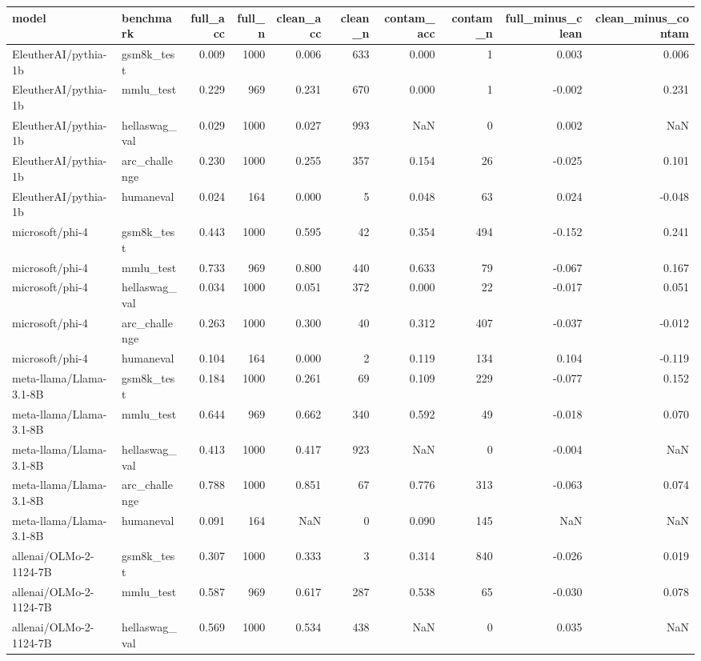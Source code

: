 \begin{tabular}{llrrrrrrrr}
\toprule
model & benchmark & full_acc & full_n & clean_acc & clean_n & contam_acc & contam_n & full_minus_clean & clean_minus_contam \\
\midrule
EleutherAI/pythia-1b & gsm8k_test & 0.009 & 1000 & 0.006 & 633 & 0.000 & 1 & 0.003 & 0.006 \\
EleutherAI/pythia-1b & mmlu_test & 0.229 & 969 & 0.231 & 670 & 0.000 & 1 & -0.002 & 0.231 \\
EleutherAI/pythia-1b & hellaswag_val & 0.029 & 1000 & 0.027 & 993 & NaN & 0 & 0.002 & NaN \\
EleutherAI/pythia-1b & arc_challenge & 0.230 & 1000 & 0.255 & 357 & 0.154 & 26 & -0.025 & 0.101 \\
EleutherAI/pythia-1b & humaneval & 0.024 & 164 & 0.000 & 5 & 0.048 & 63 & 0.024 & -0.048 \\
microsoft/phi-4 & gsm8k_test & 0.443 & 1000 & 0.595 & 42 & 0.354 & 494 & -0.152 & 0.241 \\
microsoft/phi-4 & mmlu_test & 0.733 & 969 & 0.800 & 440 & 0.633 & 79 & -0.067 & 0.167 \\
microsoft/phi-4 & hellaswag_val & 0.034 & 1000 & 0.051 & 372 & 0.000 & 22 & -0.017 & 0.051 \\
microsoft/phi-4 & arc_challenge & 0.263 & 1000 & 0.300 & 40 & 0.312 & 407 & -0.037 & -0.012 \\
microsoft/phi-4 & humaneval & 0.104 & 164 & 0.000 & 2 & 0.119 & 134 & 0.104 & -0.119 \\
meta-llama/Llama-3.1-8B & gsm8k_test & 0.184 & 1000 & 0.261 & 69 & 0.109 & 229 & -0.077 & 0.152 \\
meta-llama/Llama-3.1-8B & mmlu_test & 0.644 & 969 & 0.662 & 340 & 0.592 & 49 & -0.018 & 0.070 \\
meta-llama/Llama-3.1-8B & hellaswag_val & 0.413 & 1000 & 0.417 & 923 & NaN & 0 & -0.004 & NaN \\
meta-llama/Llama-3.1-8B & arc_challenge & 0.788 & 1000 & 0.851 & 67 & 0.776 & 313 & -0.063 & 0.074 \\
meta-llama/Llama-3.1-8B & humaneval & 0.091 & 164 & NaN & 0 & 0.090 & 145 & NaN & NaN \\
allenai/OLMo-2-1124-7B & gsm8k_test & 0.307 & 1000 & 0.333 & 3 & 0.314 & 840 & -0.026 & 0.019 \\
allenai/OLMo-2-1124-7B & mmlu_test & 0.587 & 969 & 0.617 & 287 & 0.538 & 65 & -0.030 & 0.078 \\
allenai/OLMo-2-1124-7B & hellaswag_val & 0.569 & 1000 & 0.534 & 438 & NaN & 0 & 0.035 & NaN \\

\end{tabular}
